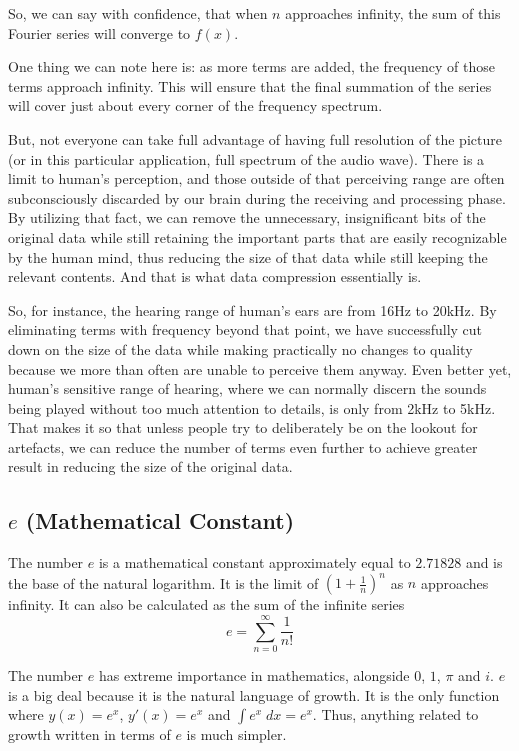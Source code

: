 \documentclass[a4paper]{article}
\begin{document}
So, we can say with confidence, that when $n$ approaches infinity, the sum of this Fourier series will converge to $f(x)$.

One thing we can note here is: as more terms are added, the frequency of those terms approach infinity. This will ensure that the final summation of the series will cover just about every corner of the frequency spectrum.

But, not everyone can take full advantage of having full resolution of the picture (or in this particular application, full spectrum of the audio wave). There is a limit to human's perception, and those outside of that perceiving range are often subconsciously discarded by our brain during the receiving and processing phase. By utilizing that fact, we can remove the unnecessary, insignificant bits of the original data while still retaining the important parts that are easily recognizable by the human mind, thus reducing the size of that data while still keeping the relevant contents. And that is what data compression essentially is.

So, for instance, the hearing range of human's ears are from 16Hz to 20kHz. By eliminating terms with frequency beyond that point, we have successfully cut down on the size of the data while making practically no changes to quality because we more than often are unable to perceive them anyway. Even better yet, human's sensitive range of hearing, where we can normally discern the sounds being played without too much attention to details, is only from 2kHz to 5kHz. That makes it so that unless people try to deliberately be on the lookout for artefacts, we can reduce the number of terms even further to achieve greater result in reducing the size of the original data. 

\newpage
\subsection{$\mathit{e}$ (Mathematical Constant)}
The number $\mathit{e}$ is a mathematical constant approximately equal to $2.71828$ and is the base of the natural logarithm. It is the limit of $(1+\frac{1}{n})^n$ as $n$ approaches infinity. It can also be calculated as the sum of the infinite series
\begin{equation*}
	\mathit{e} = \sum_{n=0}^{\infty}\frac{1}{n!}
\end{equation*}

The number $\mathit{e}$ has extreme importance in mathematics, alongside $0$, $1$, $\pi$ and $\mathit{i}$. $\mathit{e}$ is a big deal because it is the natural language of growth. It is the only function where $y(x)=\mathit{e}^x$, $y\prime(x)=\mathit{e}^x$ and $\int \mathit{e}^x\;dx = \mathit{e}^x$. Thus, anything related to growth written in terms of $\mathit{e}$ is much simpler.
\end{document}

